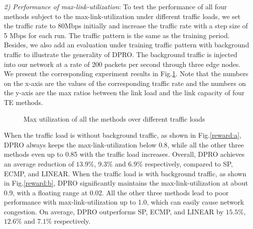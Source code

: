 \documentclass[10pt,conference]{IEEEtran}
\begin{document}
\emph{2) Performance of max-link-utilization}: To test the performance of all four methods subject to the max-link-utilization under different traffic loads, we set the traffic rate to 80Mbps initially and increase the traffic rate with a step size of 5 Mbps for each run. The traffic pattern is the same as the training period. Besides, we also add an evaluation under training traffic pattern with background traffic to illustrate the generality of DPRO. The background traffic is injected into our network at a rate of 200 packets per second through three edge nodes. We present the corresponding experiment results in Fig.\ref{reward-traffic}. Note that the numbers on the x-axis are the values of the corresponding traffic rate and the numbers on the y-axis are the max ratios between the link load and the link capacity of four TE methods.
\begin{figure}[t]
\centering
{}
\caption{Max utilization of all the methods over different traffic loads}
\label{reward-traffic}
\end{figure}

When the traffic load is without background traffic, as shown in Fig.\ref{reward:a}, DPRO always keeps the max-link-utilization below 0.8, while all the other three methods even up to 0.85 with the traffic load increases. Overall, DPRO achieves an average reduction of $13.9\%$, $9.3\%$ and $6.9\%$ respectively, compared to SP, ECMP, and LINEAR. When the traffic load is with background traffic, as shown in Fig.\ref{reward:b}, DPRO significantly maintains the max-link-utilization at about 0.9, with a floating range at 0.02. All the other three methods lead to poor performance with max-link-utilization up to 1.0, which can easily cause network congestion. On average, DPRO outperforms SP, ECMP, and LINEAR by $15.5\%$, $12.6\%$ and $7.1\%$ respectively.
\end{document}
